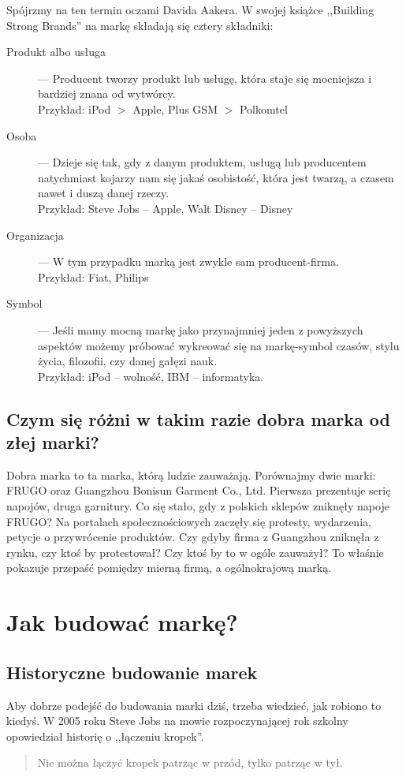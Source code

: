 \documentclass [a4paper, 11pt]{article}
\begin{document}
Spójrzmy na ten termin oczami Davida Aakera. W swojej książce ,,Building Strong Brands''\cite[s.~68]{aaker} na markę składają się cztery składniki:
\begin{description}
	\item[Produkt albo usługa] --- Producent tworzy produkt lub usługę, która staje się mocniejsza i bardziej znana od wytwórcy.\\
	Przykład: iPod $>$ Apple, Plus GSM $>$ Polkomtel
	\item[Osoba] --- Dzieje się tak, gdy z danym produktem, usługą lub producentem natychmiast kojarzy nam się jakaś osobistość, która jest twarzą, a czasem nawet i duszą danej rzeczy.\\
	Przykład: Steve Jobs -- Apple, Walt Disney -- Disney
	\item[Organizacja] --- W tym przypadku marką jest zwykle sam producent-firma.\\
	Przykład: Fiat, Philips
	\item[Symbol] --- Jeśli mamy mocną markę jako przynajmniej jeden z powyższych aspektów możemy próbować wykreować się na markę-symbol czasów, stylu życia, filozofii, czy danej gałęzi nauk.\\
	Przykład: iPod -- wolność, IBM -- informatyka.
\end{description}

\subsection{Czym się różni w takim razie dobra marka od złej marki?}
Dobra marka to ta marka, którą ludzie zauważają. \cite{pogorzelski} Porównajmy dwie marki: FRUGO oraz Guangzhou Bonisun Garment Co., Ltd. Pierwsza prezentuje serię napojów, druga garnitury. Co się stało, gdy z polskich sklepów zniknęły napoje FRUGO? Na portalach społecznościowych zaczęły się protesty, wydarzenia, petycje o przywrócenie produktów. Czy gdyby firma z Guangzhou zniknęła z rynku, czy ktoś by protestował? Czy ktoś by to w ogóle zauważył? To właśnie pokazuje przepaść pomiędzy mierną firmą, a ogólnokrajową marką.

\section{Jak budować markę?}
\subsection{Historyczne budowanie marek}
Aby dobrze podejść do budowania marki dziś, trzeba wiedzieć, jak robiono to kiedyś. W 2005 roku Steve Jobs na mowie rozpoczynającej rok szkolny opowiedział historię o ,,łączeniu kropek''.
\begin{quote}
Nie można łączyć kropek patrząc w przód, tylko patrząc w tył. \begin{flushright}\cite{jobs}\end{flushright}
\end{quote}
\end{document}
